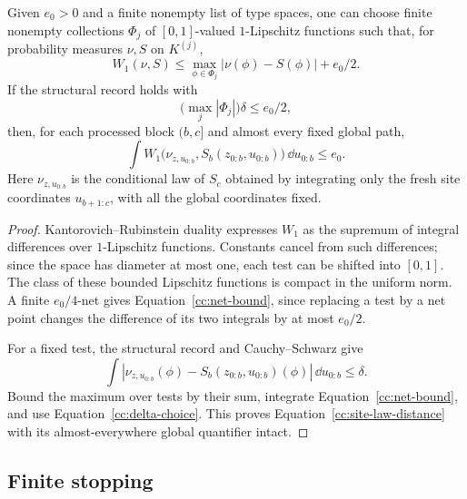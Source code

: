 \begin{lemma}\label{cc:site-law}
Given $e_0>0$ and a finite nonempty list of type spaces, one can choose finite
nonempty collections $\Phi_j$ of $[0,1]$-valued $1$-Lipschitz functions
such that, for probability measures $\nu,S$ on $K^{(j)}$,
\begin{equation}\label{cc:net-bound}
 W_1(\nu,S)
 \le\max_{\phi\in\Phi_j}|\nu(\phi)-S(\phi)|+e_0/2.
\end{equation}
If the structural record holds with
\begin{equation}\label{cc:delta-choice}
 \bigl(\max_j|\Phi_j|\bigr)\delta\le e_0/2,
\end{equation}
then, for each processed block $(b,c]$ and almost every fixed global
path,
\begin{equation}\label{cc:site-law-distance}
 \int W_1\bigl(\nu_{z,u_{0:b}},S_b(z_{0:b},u_{0:b})\bigr)
               \,\dd u_{0:b}\le e_0.
\end{equation}
Here $\nu_{z,u_{0:b}}$ is the conditional law of $S_c$ obtained by
integrating only the fresh site coordinates $u_{b+1:c}$, with all the
global coordinates fixed.
\end{lemma}

\begin{proof}
Kantorovich--Rubinstein duality expresses $W_1$ as the supremum of
integral differences over $1$-Lipschitz functions.  Constants cancel from
such differences; since the space has diameter at most one, each test
can be shifted into $[0,1]$.  The class of these bounded Lipschitz
functions is compact in the uniform norm.  A finite $e_0/4$-net gives
Equation~\eqref{cc:net-bound}, since replacing a test by a net point
changes the difference of its two integrals by at most $e_0/2$.

For a fixed test, the structural record and Cauchy--Schwarz give
\[
 \int |\nu_{z,u_{0:b}}(\phi)-S_b(z_{0:b},u_{0:b})(\phi)|
                 \,\dd u_{0:b}\le\delta.
\]
Bound the maximum over tests by their sum, integrate
Equation~\eqref{cc:net-bound}, and use
Equation~\eqref{cc:delta-choice}.  This proves
Equation~\eqref{cc:site-law-distance} with its almost-everywhere global
quantifier intact.
\end{proof}

\subsection{Finite stopping}


